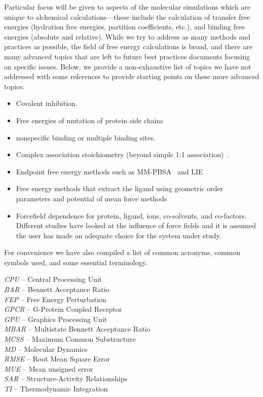 \documentclass[9pt,bestpractices]{livecoms}
\begin{document}
Particular focus will be given to aspects of the molecular simulations which are unique to alchemical calculations---these include the calculation of transfer free energies (hydration free energies, partition coefficients, etc.), and binding free energies (absolute and relative).
%
While we try to address as many methods and practices as possible, the field of free energy calculations is broad, and there are many advanced topics that are left to future best practices documents focusing on specific issues. 
Below, we provide a non-exhaustive list of topics we have not addressed with some references to provide starting points on these more advanced topics:
\begin{itemize}
\item Covalent inhibition.
\item Free energies of mutation of protein side chains
\item nonspecific binding or multiple binding sites.
\item Complex association stoichiometry (beyond simple 1:1 association)~\cite{awesome reference}.
\item Endpoint free energy methods such as MM-PBSA~\cite{genheden2015mm} and LIE~\cite{gutierrez-de-teran2012linear}
\item Free energy methods that extract the ligand using geometric order parameters and potential of mean force methods~\cite{heinzelmann2017attachpullrelease}
\item Forcefield dependence for protein, ligand, ions, co-solvents, and co-factors. Different studies have looked at the influence of force fields and it is assumed the user has made an adequate choice for the system under study.~\cite{loeffler2018reproducibility, vassetti2019assessment, lopes2015current} 
\end{itemize}
%
For convenience we have also compiled a list of common acronyms, common symbols used, and some essential terminology.
\begin{tcolorbox}[title=Acronyms, colback=blue!10!white]
    \textit{CPU} -- Central Processing Unit\\
    \textit{BAR} -- Bennett Acceptance Ratio\\
    \textit{FEP} -- Free Energy Perturbation\\
    \textit{GPCR} -- G-Protein Coupled Receptor\\
    \textit{GPU} -- Graphics Processing Unit\\
    \textit{MBAR} -- Multistate Bennett Acceptance Ratio\\
    \textit{MCSS} -- Maximum Common Substructure\\
    \textit{MD} -- Molecular Dynamics\\
    \textit{RMSE} -- Root Mean Square Error\\
    \textit{MUE} -- Mean unsigned error\\
    \textit{SAR} -- Structure-Activity Relationships\\
    \textit{TI} -- Thermodynamic Integration
\end{tcolorbox}
\end{document}

